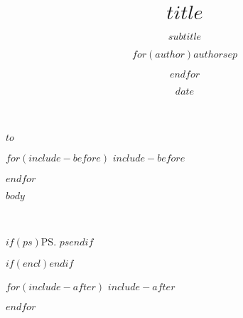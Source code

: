 \documentclass[$if(fontsize)$$fontsize$,$endif$$if(lang)$$lang$,$endif$$if(papersize)$$papersize$,$endif$$for(classoption)$$classoption$$sep$,$endfor$]{scrlttr2}
\title{$title$}
\subtitle{$subtitle$}
\author{$for(author)$$author$$sep$ \and $endfor$}
\date{$date$}
\begin{document}
\begin{letter}{%
$to$
}

$for(include-before)$
$include-before$

$endfor$

\opening{}

$body$

\closing{}

$if(ps)$\ps{$ps$}$endif$

$if(encl)$$endif$

$for(include-after)$
$include-after$

$endfor$

\end{letter}
\end{document}
